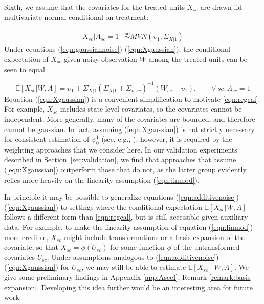 \documentclass[aoas]{imsart}
\theoremstyle{plain}
\theoremstyle{remark}
\begin{document}
Sixth, we assume that the covariates for the treated units $X_{sc}$ are drawn iid multivariate normal conditional on treatment:

\begin{align} \label{eqn:Xgaussian}
    X_{sc}|A_{sc} = 1 & \stackrel{\text{iid}}{\sim} MVN(\upsilon_1, \Sigma_{X|1})%
\end{align}
%
Under equations (\ref{eqn:gaussiannoise})-(\ref{eqn:Xgaussian}), the conditional expectation of $X_{sc}$ given noisy observation $W$ among the treated units can be seen to equal 

\begin{equation} \label{eqn:regcal}
\mathbb{E}[X_{sc}| W, A] = \upsilon_1 + \Sigma_{X|1} \left(\Sigma_{X|1} + \Sigma_{\nu, sc}\right)^{-1}  (W_{sc} - \upsilon_1), \qquad \forall\, sc: A_{sc} = 1
\end{equation}
%
Equation (\ref{eqn:Xgaussian}) is a convenient simplification to motivate \eqref{eqn:regcal}. For example, $X_{sc}$ includes state-level covariates, so the covariates cannot be independent. More generally, many of the covariates are bounded, and therefore cannot be gaussian. In fact, assuming (\ref{eqn:Xgaussian}) is not strictly necessary for consistent estimation of $\psi_0^1$ (see, e.g., \cite{gleser1992importance}); however, it is required by the weighting approaches that we consider here. In our validation experiments described in Section~\ref{sec:validation}, we find that approaches that assume (\ref{eqn:Xgaussian}) outperform those that do not, as the latter group evidently relies more heavily on the linearity assumption (\ref{eqn:linmod}).

In principle it may be possible to generalize equations (\ref{eqn:additivenoise})-(\ref{eqn:Xgaussian}) to settings where the conditional expectation $\mathbb{E}[X_{sc}|W,A]$ follows a different form than \eqref{eqn:regcal}, but is still accessible given auxiliary data. For example, to make the linearity assumption of equation (\ref{eqn:linmod}) more credible, $X_{sc}$ might include transformations or a basis expansion of the covariate, so that $X_{sc} = \phi(U_{sc})$ for some function $\phi$ of the untransformed covariates $U_{sc}$. Under assumptions analogous to (\ref{eqn:additivenoise})-(\ref{eqn:Xgaussian}) for $U_{sc}$, we may still be able to estimate $\mathbb{E}[X_{sc} \mid W, A]$. We give some preliminary findings in Appendix \ref{app:AsecI}, Remark \ref{remark:basis expansion}. Developing this idea further would be an interesting area for future work.
 
\end{document}
